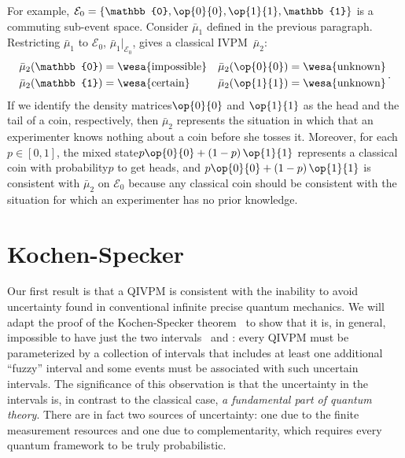 \documentclass[english,reprint, aps, prl,superscriptaddress, showpacs,
showkeys, longbibliography, amsmath, amssymb]{revtex4-1}
\theoremstyle{plain}
\theoremstyle{definition}
\newcommand{\events}{\ensuremath{\mathcal{E}}}
\newcommand{\imposs}{{\text{\wesa{impossible}}}}
\newcommand{\necess}{{\text{\wesa{certain}}}}
\newcommand{\unknown}{{\text{\wesa{unknown}}}}
\newcommand{\proj}[1]{\op{#1}{#1}}
\newcommand{\nb}{\nolinebreak[1] }
\begin{document}
For example, $\events_{0}=\left\{ \mathbb{0},\proj{0},\proj{1},\mathbb{1}\right\} $
is a commuting sub-event space. Consider $\bar{\mu}_{1}$ defined
in the previous paragraph. Restricting $\bar{\mu}_{1}$ to
$\events_{0}$, $\bar{\mu}_{1}|_{\events_{0}}$, gives a classical
IVPM~$\bar{\mu}_{2}$:
\begin{equation}
\begin{aligned}\bar{\mu}_{2}(\mathbb{0}) & =\imposs & \bar{\mu}_{2}(\proj{0}) & =\unknown\\
\bar{\mu}_{2}(\mathbb{1}) & =\necess & \bar{\mu}_{2}(\proj{1}) & =\unknown
\end{aligned}
\,.
\end{equation}
If we identify the density matrices\nb$\proj{0}$ and $\proj{1}$ as
the head and the tail of a coin, respectively, then $\bar{\mu}_{2}$
represents the situation in which that an experimenter knows nothing about a
coin before she tosses it. Moreover, for each $p\in\left[0,1\right]$, the mixed
state\nb$p\proj{0}+\left(1-p\right)\proj{1}$ represents a classical
coin with probability\nb$p$ to get heads, and
$p\proj{0}+\left(1-p\right)\proj{1}$ is consistent with $\bar{\mu}_{2}$ on $\events_{0}$ because any
classical coin should be consistent with the situation for which an experimenter
has no prior knowledge.

\section{Kochen-Specker} 
  \label{sec:Kochen-Specker}
  
Our first result is that a QIVPM is consistent with the inability to avoid
uncertainty found in conventional infinite precise quantum
mechanics\nb\cite{PeresRon1988,peres1995quantum}. We will adapt
the proof of the Kochen-Specker theorem~\cite{kochenspecker1967,
  peres1995quantum,Redhead1987-REDINA,Griffiths2003} to show that it
is, in general, impossible to have just the two intervals \imposs\ and
\necess: every QIVPM must be parameterized by a collection of
intervals that includes at least one additional ``fuzzy'' interval and
some events must be associated with such uncertain intervals. The
significance of this observation is that the uncertainty in the
intervals is, in contrast to the classical case, \emph{a fundamental
  part of quantum theory}. There are in fact two sources of
uncertainty: one due to the finite measurement resources and one due
to complementarity, which requires every quantum framework to be truly
probabilistic.
\end{document}

